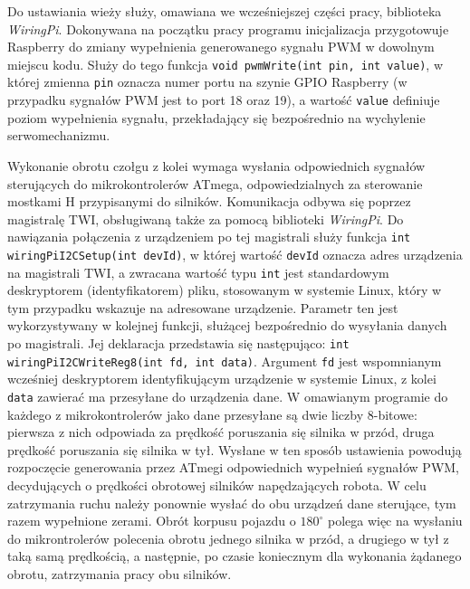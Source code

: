 Do ustawiania wieży służy, omawiana we wcześniejszej części pracy, biblioteka \textit{WiringPi}. Dokonywana na początku pracy programu inicjalizacja przygotowuje Raspberry do zmiany wypełnienia generowanego sygnału PWM w dowolnym miejscu kodu.  Służy do tego funkcja \texttt{void pwmWrite(int pin, int value)}, w której zmienna \texttt{pin} oznacza numer portu na szynie GPIO Raspberry (w przypadku sygnałów PWM jest to port 18 oraz 19), a wartość \texttt{value} definiuje poziom wypełnienia sygnału, przekładający się bezpośrednio na wychylenie serwomechanizmu.

Wykonanie obrotu czołgu z kolei wymaga wysłania odpowiednich sygnałów sterujących do mikrokontrolerów ATmega, odpowiedzialnych za sterowanie mostkami H przypisanymi do silników. Komunikacja odbywa się poprzez magistralę TWI, obsługiwaną także za pomocą biblioteki \textit{WiringPi}. Do nawiązania połączenia z urządzeniem po tej magistrali służy funkcja \texttt{int wiringPiI2CSetup(int devId)}, w której wartość \texttt{devId} oznacza adres urządzenia na magistrali TWI, a zwracana wartość typu \texttt{int} jest standardowym deskryptorem (identyfikatorem) pliku, stosowanym w systemie Linux, który w tym przypadku wskazuje na adresowane urządzenie. Parametr ten jest wykorzystywany w kolejnej funkcji, służącej bezpośrednio do wysyłania danych po magistrali. Jej deklaracja przedstawia się następująco: \texttt{int wiringPiI2CWriteReg8(int fd, int data)}. Argument \texttt{fd} jest wspomnianym wcześniej deskryptorem identyfikującym urządzenie w systemie Linux, z kolei \texttt{data}
zawierać ma przesyłane do urządzenia dane. W omawianym programie do każdego z mikrokontrolerów jako dane przesyłane są dwie liczby 8-bitowe: pierwsza z nich odpowiada za prędkość poruszania się silnika w przód, druga prędkość poruszania się silnika w tył. Wysłane w ten sposób ustawienia powodują rozpoczęcie generowania przez ATmegi odpowiednich wypełnień sygnałów PWM, decydujących o prędkości obrotowej silników napędzających robota. W celu zatrzymania ruchu należy ponownie wysłać do obu urządzeń dane sterujące, tym razem wypełnione zerami. Obrót korpusu pojazdu o $180^\circ$ polega więc na wysłaniu do mikrontrolerów polecenia obrotu jednego silnika w przód, a drugiego w tył z taką samą prędkością, a następnie, po czasie koniecznym dla wykonania żądanego obrotu, zatrzymania pracy obu silników.

